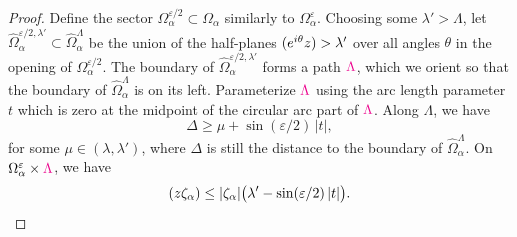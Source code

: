 \documentclass{article}
\let\Re\relax
\DeclareMathOperator{\Re}{Re}
\theoremstyle{definition}
\theoremstyle{plain}
\begin{document}
\begin{proof}
Define the sector $\Omega_\alpha^{\varepsilon/2} \subset \Omega_\alpha$ similarly to $\Omega_\alpha^\varepsilon$. Choosing some $\lambda' > \Lambda$, let $\widehat{\Omega}_\alpha^{\varepsilon/2, \lambda'} \subset \widehat{\Omega}_\alpha^\Lambda$ be the union of the half-planes $\Re(e^{i\theta} z) > \lambda'$ over all angles $\theta$ in the opening of $\Omega_\alpha^{\varepsilon/2}$. The boundary of $\widehat{\Omega}_\alpha^{\varepsilon/2, \lambda'}$ forms a path $\textcolor{magenta}{\Lambda}$, which we orient so that the boundary of $\widehat{\Omega}_\alpha^\Lambda$ is on its left. Parameterize $\textcolor{magenta}{\Lambda}$ using the arc length parameter $t$ which is zero at the midpoint of the circular arc part of $\textcolor{magenta}{\Lambda}$. Along $\Lambda$, we have
\[ \Delta \ge \mu + \sin(\varepsilon/2)\,|t|, \]
for some $\mu \in (\lambda, \lambda')$, where $\Delta$ is still the distance to the boundary of $\widehat{\Omega}_\alpha^\Lambda$. On $\Omega_\alpha^\varepsilon \times \textcolor{magenta}{\Lambda}$, we have
\[ \Re(z\zeta_\alpha) \le |\zeta_\alpha| \big(\lambda' - \sin(\varepsilon/2)\,|t|\big). \]




\end{proof}
\end{document}
